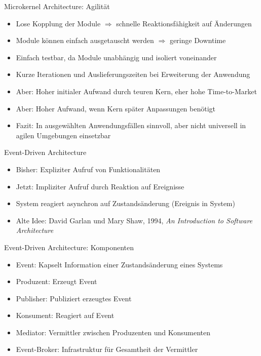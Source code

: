 \begin{frame}{Microkernel Architecture: Agilität}
    \begin{itemize}
        \item Lose Kopplung der Module $\Rightarrow$ schnelle Reaktionsfähigkeit auf Änderungen
        \item Module können einfach ausgetauscht werden $\Rightarrow$ geringe Downtime
        \item Einfach testbar, da Module unabhängig und isoliert voneinander
        \item Kurze Iterationen und Auslieferungszeiten bei Erweiterung der Anwendung
        \item Aber: Hoher initialer Aufwand durch teuren Kern, eher hohe Time-to-Market
        \item Aber: Hoher Aufwand, wenn Kern später Anpassungen benötigt
        \item Fazit: In ausgewählten Anwendungsfällen sinnvoll, aber nicht universell in agilen Umgebungen einsetzbar
    \end{itemize}
\end{frame}


\begin{frame}{Event-Driven Architecture}
    \begin{itemize}
        \item Bisher: Expliziter Aufruf von Funktionalitäten
        \item Jetzt: Impliziter Aufruf durch Reaktion auf Ereignisse \cite{garlanShawImplizit}
        \item System reagiert asynchron auf Zustandsänderung (Ereignis in System)
        \item Alte Idee: David Garlan und Mary Shaw, 1994, \textit{An Introduction to Software Architecture}
    \end{itemize}
\end{frame}

\begin{frame}{Event-Driven Architecture: Komponenten}
    \begin{itemize}
        \item Event: Kapselt Information einer Zustandsänderung eines Systems \cite{eda}
        \item Produzent: Erzeugt Event
        \item Publisher: Publiziert erzeugtes Event
        \item Konsument: Reagiert auf Event
        \item Mediator: Vermittler zwischen Produzenten und Konsumenten
        \item Event-Broker: Infrastruktur für Gesamtheit der Vermittler
    \end{itemize}
\end{frame}

